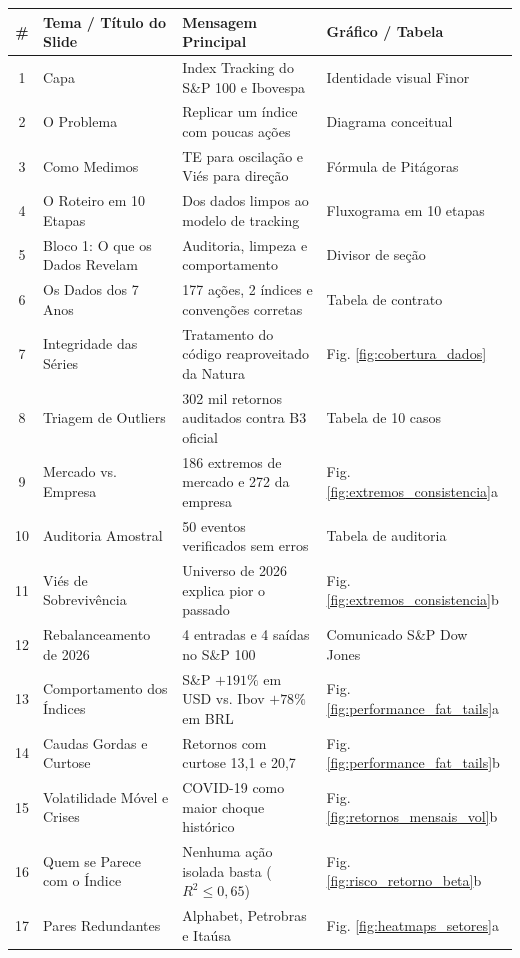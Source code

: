 \documentclass[11pt,a4paper]{article}
\begin{document}
\begin{longtable}{c p{} p{} p{}}
\toprule
\textbf{\#} & \textbf{Tema / Título do Slide} & \textbf{Mensagem Principal} & \textbf{Gráfico / Tabela} \\
\midrule
\endhead
1 & Capa & Index Tracking do S\&P 100 e Ibovespa & Identidade visual Finor \\
2 & O Problema & Replicar um índice com poucas ações & Diagrama conceitual \\
3 & Como Medimos & TE para oscilação e Viés para direção & Fórmula de Pitágoras \\
4 & O Roteiro em 10 Etapas & Dos dados limpos ao modelo de tracking & Fluxograma em 10 etapas \\
5 & Bloco 1: O que os Dados Revelam & Auditoria, limpeza e comportamento & Divisor de seção \\
6 & Os Dados dos 7 Anos & 177 ações, 2 índices e convenções corretas & Tabela de contrato \\
7 & Integridade das Séries & Tratamento do código reaproveitado da Natura & Fig. \ref{fig:cobertura_dados} \\
8 & Triagem de Outliers & 302 mil retornos auditados contra B3 oficial & Tabela de 10 casos \\
9 & Mercado vs. Empresa & 186 extremos de mercado e 272 da empresa & Fig. \ref{fig:extremos_consistencia}a \\
10 & Auditoria Amostral & 50 eventos verificados sem erros & Tabela de auditoria \\
11 & Viés de Sobrevivência & Universo de 2026 explica pior o passado & Fig. \ref{fig:extremos_consistencia}b \\
12 & Rebalanceamento de 2026 & 4 entradas e 4 saídas no S\&P 100 & Comunicado S\&P Dow Jones \\
13 & Comportamento dos Índices & S\&P $+191\%$ em USD vs. Ibov $+78\%$ em BRL & Fig. \ref{fig:performance_fat_tails}a \\
14 & Caudas Gordas e Curtose & Retornos com curtose 13,1 e 20,7 & Fig. \ref{fig:performance_fat_tails}b \\
15 & Volatilidade Móvel e Crises & COVID-19 como maior choque histórico & Fig. \ref{fig:retornos_mensais_vol}b \\
16 & Quem se Parece com o Índice & Nenhuma ação isolada basta ($R^2 \le 0,65$) & Fig. \ref{fig:risco_retorno_beta}b \\
17 & Pares Redundantes & Alphabet, Petrobras e Itaúsa & Fig. \ref{fig:heatmaps_setores}a \\

\end{longtable}
\end{document}
